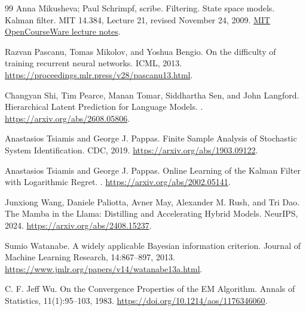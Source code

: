 \documentclass[11pt,twoside]{article}
\theoremstyle{definition}
\theoremstyle{remark}
\begin{document}
\begin{thebibliography}{99}
Anna Mikusheva; Paul Schrimpf, scribe.
\newblock Filtering. State space models. Kalman filter.
\newblock MIT 14.384, Lecture 21, revised November 24, 2009.
\newblock \href{https://ocw.mit.edu/courses/14-384-time-series-analysis-fall-2013/3dcb917d20ece78852cd398a3f7b5e64_MIT14_384F13_lec21.pdf}{MIT OpenCourseWare lecture notes}.

Razvan Pascanu, Tomas Mikolov, and Yoshua Bengio.
\newblock On the difficulty of training recurrent neural networks.
\newblock ICML, 2013.
\newblock \url{https://proceedings.mlr.press/v28/pascanu13.html}.

Changyan Shi, Tim Pearce, Manan Tomar, Siddhartha Sen, and John Langford.
\newblock Hierarchical Latent Prediction for Language Models.
. \url{https://arxiv.org/abs/2608.05806}.

Anastasios Tsiamis and George J. Pappas.
\newblock Finite Sample Analysis of Stochastic System Identification.
\newblock CDC, 2019.
\newblock \url{https://arxiv.org/abs/1903.09122}.

Anastasios Tsiamis and George J. Pappas.
\newblock Online Learning of the Kalman Filter with Logarithmic Regret.
. \url{https://arxiv.org/abs/2002.05141}.

Junxiong Wang, Daniele Paliotta, Avner May, Alexander M. Rush, and Tri Dao.
\newblock The Mamba in the Llama: Distilling and Accelerating Hybrid Models.
\newblock NeurIPS, 2024. \url{https://arxiv.org/abs/2408.15237}.

Sumio Watanabe.
\newblock A widely applicable Bayesian information criterion.
\newblock Journal of Machine Learning Research, 14:867--897, 2013.
\newblock \url{https://www.jmlr.org/papers/v14/watanabe13a.html}.

C. F. Jeff Wu.
\newblock On the Convergence Properties of the EM Algorithm.
\newblock Annals of Statistics, 11(1):95--103, 1983.
\newblock \url{https://doi.org/10.1214/aos/1176346060}.
\end{thebibliography}
\end{document}
